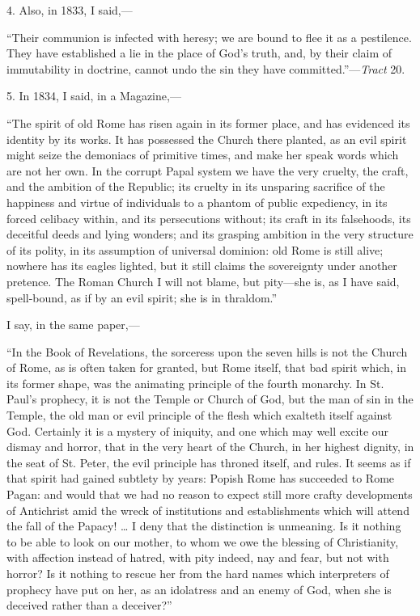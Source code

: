 4. Also, in 1833, I said,—

``Their communion is infected with heresy; we
are bound to flee it as a pestilence. They have established a lie in
the place of God's truth, and, by their claim of immutability in
doctrine, cannot undo the sin they have committed.''—\emph{Tract}
20.

5. In 1834, I said, in a Magazine,—

``The spirit of old Rome has risen again in its
former place, and has evidenced its identity by its works. It has
possessed the Church there planted, as an evil spirit might seize the
demoniacs of primitive times, and make her speak words which are not
her own. In the corrupt Papal system we have the very cruelty, the
craft, and the ambition of the Republic; its cruelty in its unsparing
sacrifice of the happiness and virtue of individuals to a phantom of
public expediency, in its forced celibacy within, and its persecutions
without; its craft in its falsehoods, its deceitful deeds and lying
wonders; and its grasping ambition in the very structure of its
polity, in its assumption of universal dominion: old Rome is still
alive; nowhere has its eagles lighted, but it still claims the
sovereignty under another pretence. The Roman Church I will not blame,
but pity—she is, as I have said, spell-bound, as if by an evil
spirit; she is in thraldom.''

I say, in the same paper,—

``In the Book of Revelations, the sorceress upon
the seven hills is not the Church of Rome, as is often taken for
granted, but Rome itself, that bad spirit which, in its former shape,
was the animating principle of the fourth monarchy. In St. Paul's
prophecy, it is not the Temple or Church of God, but the man of sin in
the Temple, the old man or evil principle of the flesh which exalteth
itself against God. Certainly it is a mystery of iniquity, and one
which may well excite our dismay and horror, that in the very heart of
the Church, in her highest dignity, in the seat of St. Peter, the evil
principle has throned itself, and rules. It seems as if that spirit
had gained subtlety by years: Popish Rome has succeeded to Rome Pagan:
and would that we had no reason to expect still more crafty
developments of Antichrist amid the wreck of institutions and
establishments which will attend the fall of the Papacy! … I deny
that the distinction is unmeaning. Is it nothing to be able to look on
our mother, to whom we owe the blessing of Christianity, with
affection instead of hatred, with pity indeed, nay and fear, but not
with horror? Is it nothing to rescue her from the hard names which
interpreters of prophecy have put on her, as an idolatress and an
enemy of God, when she is deceived rather than a deceiver?''

